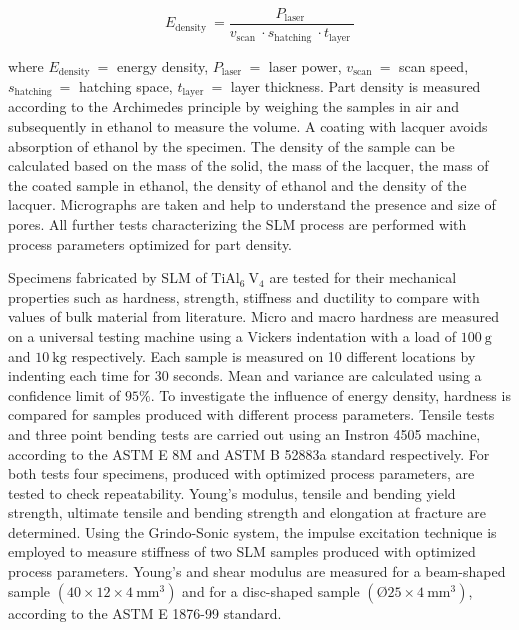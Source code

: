 \documentclass[10pt]{article}
\begin{document}
$$
E_{\text {density }}=\frac{P_{\text {laser }}}{v_{\text {scan }} \cdot s_{\text {hatching }} \cdot t_{\text {layer }}}
$$

where $E_{\text {density }}=$ energy density, $P_{\text {laser }}=$ laser power, $v_{\text {scan }}=$ scan speed, $s_{\text {hatching }}=$ hatching space, $t_{\text {layer }}=$ layer thickness. Part density is measured according to the Archimedes principle by weighing the samples in air and subsequently in ethanol to measure the volume. A coating with lacquer avoids absorption of ethanol by the specimen. The density of the sample can be calculated based on the mass of the solid, the mass of the lacquer, the mass of the coated sample in ethanol, the density of ethanol and the density of the lacquer. Micrographs are taken and help to understand the presence and size of pores. All further tests characterizing the SLM process are performed with process parameters optimized for part density.

Specimens fabricated by SLM of $\mathrm{TiAl}_{6} \mathrm{~V}_{4}$ are tested for their mechanical properties such as hardness, strength, stiffness and ductility to compare with values of bulk material from literature. Micro and macro hardness are measured on a universal testing machine using a Vickers indentation with a load of $100 \mathrm{~g}$ and $10 \mathrm{~kg}$ respectively. Each sample is measured on 10 different locations by indenting each time for 30 seconds. Mean and variance are calculated using a confidence limit of $95 \%$. To investigate the influence of energy density, hardness is compared for samples produced with different process parameters. Tensile tests and three point bending tests are carried out using an Instron 4505 machine, according to the ASTM E 8M and ASTM B 52883a standard respectively. For both tests four specimens, produced with optimized process parameters, are tested to check repeatability. Young's modulus, tensile and bending yield strength, ultimate tensile and bending strength and elongation at fracture are determined. Using the Grindo-Sonic system, the impulse excitation technique is employed to measure stiffness of two SLM samples produced with optimized process parameters. Young's and shear modulus are measured for a beam-shaped sample $\left(40 \times 12 \times 4 \mathrm{~mm}^{3}\right)$ and for a disc-shaped sample $\left(Ø 25 \times 4 \mathrm{~mm}^{3}\right)$, according to the ASTM E 1876-99 standard.
\end{document}
